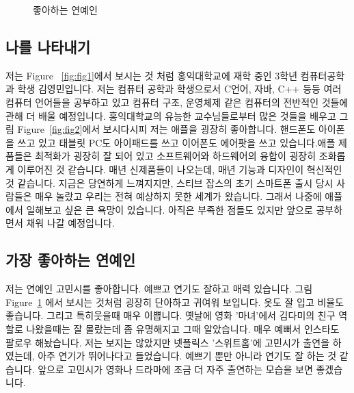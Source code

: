 \documentclass{article}
\begin{document}
\begin{figure}[H]
\begin{center}
			\caption{좋아하는 연예인}
		\label{fig:fig3}
\end{center}		
\end{figure}

\subsection{나를 나타내기}
저는 Figure ~\ref{fig:fig1}에서 보시는 것 처럼 홍익대학교에 재학 중인 3학년 컴퓨터공학과 학생 김영민입니다. 저는 컴퓨터 공학과 학생으로서 C언어, 자바, C++ 등등 여러 컴퓨터 언어들을 공부하고 있고 컴퓨터 구조, 운영체제 같은 컴퓨터의 전반적인 것들에 관해 더 배울 예정입니다. 홍익대학교의 유능한 교수님들로부터 많은 것들을 배우고 그림 Figure~\ref{fig:fig2}에서 보시다시피 저는 애플을 굉장히 좋아합니다. 핸드폰도 아이폰을 쓰고 있고 태블릿 PC도 아이패드를 쓰고 이어폰도 에어팟을 쓰고 있습니다.애플 제품들은 최적화가 굉장히 잘 되어 있고 소프트웨어와 하드웨어의 융합이 굉장히 조화롭게 이루어진 것 같습니다. 매년 신제품들이 나오는데, 매년 기능과 디자인이 혁신적인것 같습니다. 지금은 당연하게 느껴지지만, 스티브 잡스의 초기 스마트폰 출시 당시 사람들은 매우 놀랐고 우리는 전혀 예상하지 못한 세계가 왔습니다. 그래서 나중에 애플에서 일해보고 싶은 큰 욕망이 있습니다. 아직은 부족한 점들도 있지만 앞으로 공부하면서 채워 나갈 예정입니다.
\subsection{가장 좋아하는 연예인}

 저는 연예인 고민시를 좋아합니다. 예쁘고 연기도 잘하고 매력 있습니다. 그림 Figure~\ref{fig:fig3} 에서 보시는 것처럼 굉장히 단아하고 귀여워 보입니다. 옷도 잘 입고 비율도 좋습니다. 그리고 특히웃을때 매우 이쁩니다. 옛날에 영화 '마녀'에서 김다미의 친구 역할로 나왔을때는 잘 몰랐는데 좀 유명해지고 그때 알았습니다. 매우 예뻐서 인스타도 팔로우 해놨습니다. 저는 보지는 않았지만 넷플릭스 '스위트홈'에 고민시가 출연을 하였는데, 아주 연기가 뛰어나다고 들었습니다. 예쁘기 뿐만 아니라 연기도 잘 하는 것 같습니다. 앞으로 고민시가 영화나 드라마에 조금 더 자주 출연하는 모습을 보면 좋겠습니다. 
\end{document}

